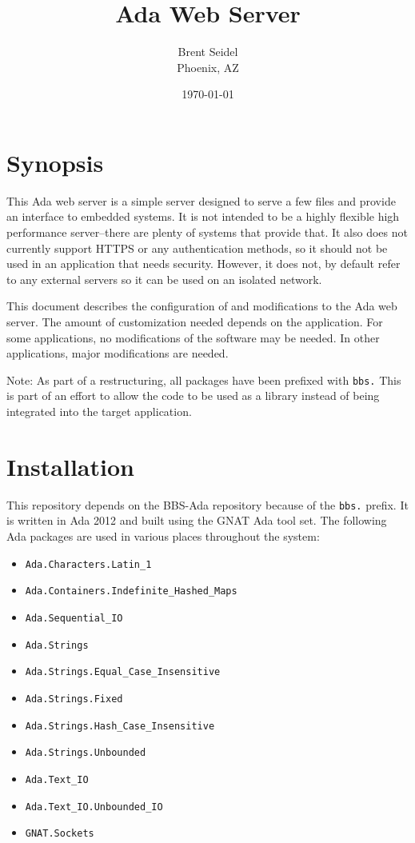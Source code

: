 \documentclass[10pt, openany, draft]{article}
\title{Ada Web Server}
\author{Brent Seidel \\ Phoenix, AZ}
\date{ \today }
\begin{document}
\maketitle
\section{Synopsis}
This Ada web server is a simple server designed to serve a few files and provide an interface to embedded systems.  It is not intended to be a highly flexible high performance server--there are plenty of systems that provide that.  It also does not currently support HTTPS or any authentication methods, so it should not be used in an application that needs security.  However, it does not, by default refer to any external servers so it can be used on an isolated network.

This document describes the configuration of and modifications to the Ada web server.  The amount of customization needed depends on the application.  For some applications, no modifications of the software may be needed.  In other applications, major modifications are needed.

Note: As part of a restructuring, all packages have been prefixed with \texttt{bbs.}  This is part of an effort to allow the code to be used as a library instead of being integrated into the target application.

\section{Installation}
This repository depends on the BBS-Ada repository because of the \texttt{bbs.} prefix.  It is written in Ada 2012 and built using the GNAT Ada tool set.  The following Ada packages are used in various places throughout the system:
\begin{itemize}
  \item \verb|Ada.Characters.Latin_1|
  \item \verb|Ada.Containers.Indefinite_Hashed_Maps|
  \item \verb|Ada.Sequential_IO|
  \item \verb|Ada.Strings|
  \item \verb|Ada.Strings.Equal_Case_Insensitive|
  \item \verb|Ada.Strings.Fixed|
  \item \verb|Ada.Strings.Hash_Case_Insensitive|
  \item \verb|Ada.Strings.Unbounded|
  \item \verb|Ada.Text_IO|
  \item \verb|Ada.Text_IO.Unbounded_IO|
  \item \verb|GNAT.Sockets|
\end{itemize}
\end{document}
